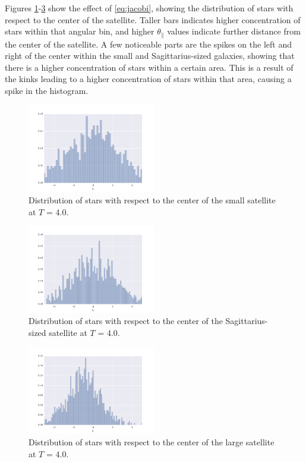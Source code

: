 \documentclass[twocolumn]{article}
\begin{document}
Figures \ref{fig:smallDist}-\ref{fig:largeDist} show the effect of \ref{eq:jacobi}, showing the distribution of stars with respect to the center of the satellite. Taller bars indicates higher concentration of stars within that angular bin, and higher $\theta_{\parallel}$ values indicate further distance from the center of the satellite. A few noticeable parts are the spikes on the left and right of the center within the small and Sagittarius-sized galaxies, showing that there is a higher concentration of stars within a certain area. This is a result of the kinks leading to a higher concentration of stars within that area, causing a spike in the histogram. 

\begin{figure}
	\centering
	\includegraphics[width=0.5\textwidth]{small_2.png}	
	\caption{Distribution of stars with respect to the center of the small satellite at $T$ = 4.0. }
	\label{fig:smallDist}
\end{figure}

\begin{figure}
	\centering
	\includegraphics[width=0.5\textwidth]{medium_2.png}	
	\caption{Distribution of stars with respect to the center of the Sagittarius-sized satellite at $T$ = 4.0. }
	\label{fig:mediumDist}
\end{figure}

\begin{figure}
	\centering
	\includegraphics[width=0.5\textwidth]{large_2.png}	
	\caption{Distribution of stars with respect to the center of the large satellite at $T$ = 4.0. }
	\label{fig:largeDist}
\end{figure}
\end{document}
